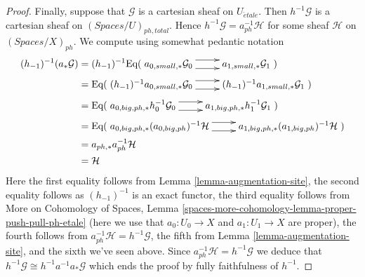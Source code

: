 \documentclass{stacks-project}
\theoremstyle{plain}
\theoremstyle{definition}
\theoremstyle{remark}
\numberwithin{equation}{subsection}
\def\etale{{\acute{e}tale}}
\begin{document}
\begin{proof}
\medskip\noindent
Finally, suppose that $\mathcal{G}$ is a cartesian sheaf on $U_\etale$.
Then $h^{-1}\mathcal{G}$ is a cartesian sheaf on
$(\textit{Spaces}/U)_{ph, total}$.
Hence $h^{-1}\mathcal{G} = a_{ph}^{-1}\mathcal{H}$ for some sheaf
$\mathcal{H}$ on $(\textit{Spaces}/X)_{ph}$.
We compute using somewhat pedantic notation
\begin{align*}
(h_{-1})^{-1}(a_*\mathcal{G})
& =
(h_{-1})^{-1}
\text{Eq}(
\xymatrix{
a_{0, small, *}\mathcal{G}_0
\ar@<1ex>[r] \ar@<-1ex>[r] &
a_{1, small, *}\mathcal{G}_1
}
) \\
& =
\text{Eq}(
\xymatrix{
(h_{-1})^{-1}a_{0, small, *}\mathcal{G}_0
\ar@<1ex>[r] \ar@<-1ex>[r] &
(h_{-1})^{-1}a_{1, small, *}\mathcal{G}_1
}
) \\
& =
\text{Eq}(
\xymatrix{
a_{0, big, ph, *}h_0^{-1}\mathcal{G}_0
\ar@<1ex>[r] \ar@<-1ex>[r] &
a_{1, big, ph, *}h_1^{-1}\mathcal{G}_1
}
) \\
& =
\text{Eq}(
\xymatrix{
a_{0, big, ph, *}(a_{0, big, ph})^{-1}\mathcal{H}
\ar@<1ex>[r] \ar@<-1ex>[r] &
a_{1, big, ph, *}(a_{1, big, ph})^{-1}\mathcal{H}
}
) \\
& =
a_{ph, *}a_{ph}^{-1}\mathcal{H} \\
& =
\mathcal{H}
\end{align*}
Here the first equality follows from Lemma \ref{lemma-augmentation-site},
the second equality follows as $(h_{-1})^{-1}$ is an exact functor,
the third equality follows from
More on Cohomology of Spaces, Lemma
\ref{spaces-more-cohomology-lemma-proper-push-pull-ph-etale}
(here we use that $a_0 : U_0 \to X$ and $a_1: U_1 \to X$ are proper),
the fourth follows from $a_{ph}^{-1}\mathcal{H} = h^{-1}\mathcal{G}$,
the fifth from Lemma \ref{lemma-augmentation-site}, and the
sixth we've seen above. Since $a_{ph}^{-1}\mathcal{H} = h^{-1}\mathcal{G}$
we deduce that $h^{-1}\mathcal{G} \cong h^{-1}a^{-1}a_*\mathcal{G}$
which ends the proof by fully faithfulness of $h^{-1}$.
\end{proof}
\end{document}
